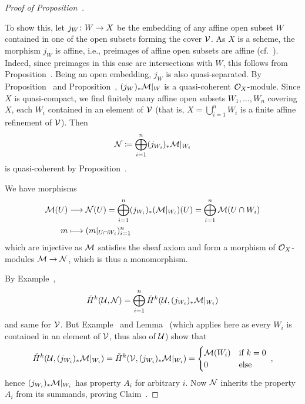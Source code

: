 \documentclass[a4paper,parskip=half,numbers=enddot, DIV=12]{scrreprt}
\begin{document}
\begin{proof}[Proof of Proposition~]
\begin{claim}
	\end{claim}
	To show this, let $j_W\colon W\morphism X$ be the embedding of any affine open subset $W$ contained in one of the open subsets forming the cover $\mathcal{V}$. As $X$ is a scheme, the morphism $j_W$ is affine, i.e., preimages of affine open subsets are affine (cf.\ \cite[Definition~2.5.1]{alggeo1}). Indeed, since preimages in this case are intersections with $W$, this follows from Proposition~. Being an open embedding, $j_W$ is also quasi-separated. By Proposition~ and Proposition~, $(j_W)_*\mathcal{M}|_W$ is a quasi-coherent $\mathcal{O}_X$-module. Since $X$ is quasi-compact, we find finitely many affine open subsets $W_1,\ldots,W_n$ covering $X$, each $W_i$ contained in an element of $\mathcal{V}$ (that is, $X=\bigcup_{i=1}^nW_i$ is a finite affine refinement of $\mathcal{V}$). Then
	\begin{align*}
		\mathcal{N}\coloneqq\bigoplus_{i=1}^n(j_{W_i})_*\mathcal{M}|_{W_i}
	\end{align*}
	is quasi-coherent by Proposition~.
	
	We have morphisms
	\begin{align*}
		\Mm(U)&\morphism\Nn(U)=\bigoplus_{i=1}^n(j_{W_i})_*(\Mm|_{W_i})(U)=\bigoplus_{i=1}^n\Mm(U\cap W_i)\\
	m&\longmapsto (m|_{U\cap W_i})_{i=1}^n
	\end{align*}
	which are injective as $\mathcal{M}$ satisfies the sheaf axiom and form a morphism of $\mathcal{O}_X$-modules $\Mm\morphism\Nn$, which is thus a monomorphism.
	
	By Example~, 
	\begin{align*}
		\check{H}^k(\mathcal{U},\mathcal{N})=\bigoplus_{i=1}^n\check{H}^k(\mathcal{U},(j_{W_i})_*\mathcal{M}|_{W_i})
	\end{align*}
	and same for $\mathcal{V}$. But Example~ and  Lemma~ (which applies here as every $W_i$ is contained in an element of $\mathcal{V}$, thus also of $\mathcal{U}$) show that 
	\begin{align*}
		\check{H}^k(\mathcal{U},(j_{W_i})_*\mathcal{M}|_{W_i})=\check{H}^k(\mathcal{V},(j_{W_i})_*\mathcal{M}|_{W_i})=\begin{cases}
			\mathcal{M}(W_i) &\text{if }k=0\\
			0 & \text{else}
		\end{cases}\;,
	\end{align*}
	hence $(j_{W_i})_*\mathcal{M}|_{W_i}$ has property $A_i$ for arbitrary $i$. Now $\mathcal{N}$ inherits the property $A_i$ from its summands, proving Claim~.
		

\end{proof}
\end{document}
